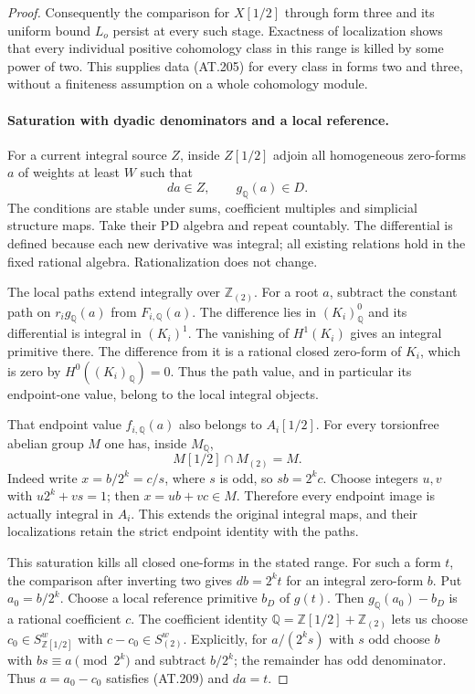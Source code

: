 \begin{proof}
Consequently the comparison for $X[1/2]$ through form three and
its uniform bound $L_o$ persist at every such stage.
Exactness of localization shows that every individual positive
cohomology class in this range is killed by some power of two.
This supplies data \textup{(AT.205)} for every class in forms
two and three, without a finiteness assumption on a whole
cohomology module.

\paragraph{Saturation with dyadic denominators and a local reference.}
For a current integral source $Z$, inside $Z[1/2]$ adjoin all
homogeneous zero-forms $a$ of weights at least $W$ such that
\[
                         da\in Z,
                  \qquad g_{\mathbb Q}(a)\in D.
 \tag{AT.209}
\]
The conditions are stable under sums, coefficient multiples and
simplicial structure maps. Take their PD algebra and repeat
countably. The differential is defined because each new derivative
was integral; all existing relations hold in the fixed rational
algebra. Rationalization does not change.

The local paths extend integrally over $\mathbb Z_{(2)}$.
For a root $a$, subtract the constant path on $r_i g_{\mathbb Q}(a)$
from $F_{i,\mathbb Q}(a)$. The difference lies in $(K_i)_{\mathbb Q}^0$
and its differential is integral in $(K_i)^1$.
The vanishing of $H^1(K_i)$ gives an integral primitive there.
The difference from it is a rational closed zero-form of $K_i$,
which is zero by $H^0((K_i)_{\mathbb Q})=0$.
Thus the path value, and in particular its endpoint-one value,
belong to the local integral objects.

That endpoint value $f_{i,\mathbb Q}(a)$ also belongs to $A_i[1/2]$.
For every torsionfree abelian group $M$ one has, inside $M_{\mathbb Q}$,
\[
                         M[1/2]\cap M_{(2)}=M.
 \tag{AT.210}
\]
Indeed write $x=b/2^k=c/s$, where $s$ is odd, so $sb=2^kc$.
Choose integers $u,v$ with $u2^k+vs=1$; then $x=ub+vc\in M$.
Therefore every endpoint image is actually integral in $A_i$.
This extends the original integral maps, and their localizations
retain the strict endpoint identity with the paths.

This saturation kills all closed one-forms in the stated range.
For such a form $t$, the comparison after inverting two gives
$db=2^kt$ for an integral zero-form $b$. Put $a_0=b/2^k$.
Choose a local reference primitive $b_D$ of $g(t)$.
Then $g_{\mathbb Q}(a_0)-b_D$ is a rational coefficient $c$.
The coefficient identity
$\mathbb Q=\mathbb Z[1/2]+\mathbb Z_{(2)}$ lets us choose
$c_0\in S_{\mathbb Z[1/2]}^w$ with $c-c_0\in S_{(2)}^w$.
Explicitly, for $a/(2^ks)$ with $s$ odd choose $b$ with
$bs\equiv a\pmod {2^k}$ and subtract $b/2^k$; the remainder
has odd denominator. Thus $a=a_0-c_0$ satisfies
\textup{(AT.209)} and $da=t$.


\end{proof}
